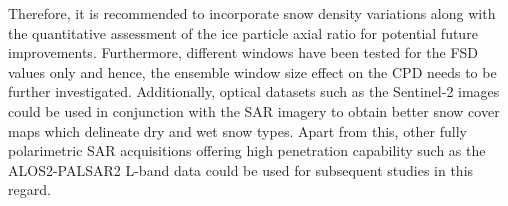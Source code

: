 \documentclass{article}
\begin{document}
Therefore, it is recommended to incorporate snow density variations along with the quantitative assessment of the ice particle axial ratio for potential future improvements. Furthermore, different windows have been tested for the FSD values only and hence, the ensemble window size effect on the CPD needs to be further investigated. Additionally, optical datasets such as the Sentinel-2 images could be used in conjunction with the SAR imagery to obtain better snow cover maps which delineate dry and wet snow types.  Apart from this, other fully polarimetric SAR acquisitions offering high penetration capability such as the ALOS2-PALSAR2 L-band data could be used for subsequent studies in this regard. 




\end{document}
